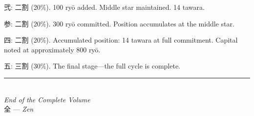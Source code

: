 \documentclass[10pt, openany]{book}
\newcommand{\jp}[1]{{\japanesefont #1}}
\begin{document}
\jp{弐}: \jp{二割} (20\%). 100 ry\=o added. Middle star maintained.
14 tawara.

\jp{参}: \jp{二割} (20\%). 300 ry\=o committed. Position accumulates at
the middle star.

\jp{四}: \jp{二割} (20\%). Accumulated position: 14 tawara at full
commitment. Capital noted at approximately 800 ry\=o.

\jp{五}: \jp{三割} (30\%). The final stage---the full cycle is complete.

\vfill

\begin{center}
\rule{2in}{0.4pt}\\[1em]
{\small\itshape End of the Complete Volume}\\[0.3em]
{\small \jp{全} --- \textit{Zen}}
\end{center}
\end{document}
